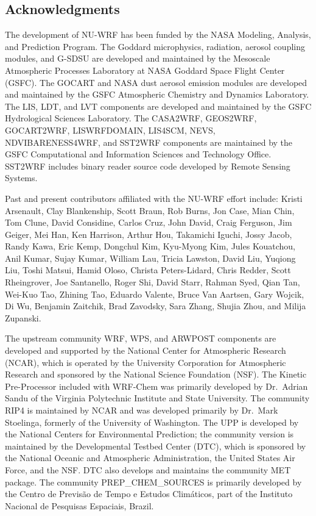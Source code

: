 \subsection{Acknowledgments}
The development of NU-WRF has been funded by the NASA Modeling, Analysis, and 
Prediction Program. The Goddard microphysics, radiation, aerosol coupling 
modules, and G-SDSU are developed and maintained by the Mesoscale 
Atmospheric Processes Laboratory at NASA Goddard Space Flight Center (GSFC). 
The GOCART and NASA dust aerosol emission modules are developed and maintained
by the GSFC Atmospheric Chemistry and Dynamics Laboratory. The LIS, LDT, and 
LVT components are developed and maintained by the GSFC Hydrological Sciences 
Laboratory. The CASA2WRF, GEOS2WRF, GOCART2WRF, LISWRFDOMAIN, LIS4SCM, 
NEVS, NDVIBARENESS4WRF, and SST2WRF components are maintained by the GSFC 
Computational and Information Sciences and Technology Office. SST2WRF includes
binary reader source code developed by Remote Sensing Systems.

Past and present contributors affiliated with the NU-WRF effort include:
Kristi Arsenault, Clay Blankenship, Scott Braun, Rob Burns, Jon Case, Mian 
Chin, Tom Clune, David Considine, Carlos Cruz, John David, Craig Ferguson, Jim Geiger, 
Mei Han, Ken Harrison, Arthur Hou, Takamichi Iguchi, Jossy Jacob, Randy Kawa, 
Eric Kemp, Dongchul Kim, Kyu-Myong Kim, Jules Kouatchou, Anil Kumar, Sujay 
Kumar, William Lau, Tricia Lawston, David Liu, Yuqiong Liu, Toshi Matsui, 
Hamid Oloso, Christa Peters-Lidard, Chris Redder, Scott Rheingrover, Joe 
Santanello, Roger Shi, David Starr, Rahman Syed, Qian Tan, Wei-Kuo Tao, 
Zhining Tao, Eduardo Valente, Bruce Van Aartsen, Gary Wojcik, Di Wu, 
Benjamin Zaitchik, Brad Zavodsky, Sara Zhang, Shujia Zhou, and Milija Zupanski.

The upstream community WRF, WPS, and ARWPOST components are developed and 
supported by the National Center for Atmospheric Research (NCAR), which is 
operated by the University Corporation for Atmospheric Research and sponsored
by the National Science Foundation (NSF). The Kinetic Pre-Processor included 
with WRF-Chem was primarily developed by Dr.~Adrian Sandu of the Virginia 
Polytechnic Institute and State University. The community RIP4 is maintained 
by NCAR and was developed primarily by Dr.~Mark Stoelinga, formerly of the 
University of Washington. The UPP is developed by the National Centers 
for Environmental Prediction; the community version is maintained by the 
Developmental Testbed Center (DTC), which is sponsored by the National Oceanic
and Atmospheric Administration, the United States Air Force, and the NSF. DTC 
also develops and maintains the community MET package.  The community 
PREP\_CHEM\_SOURCES is primarily developed by the Centro de Previs\~{a}o de 
Tempo e Estudos Clim\'{a}ticos, part of the Instituto Nacional de Pesquisas 
Espaciais, Brazil.

